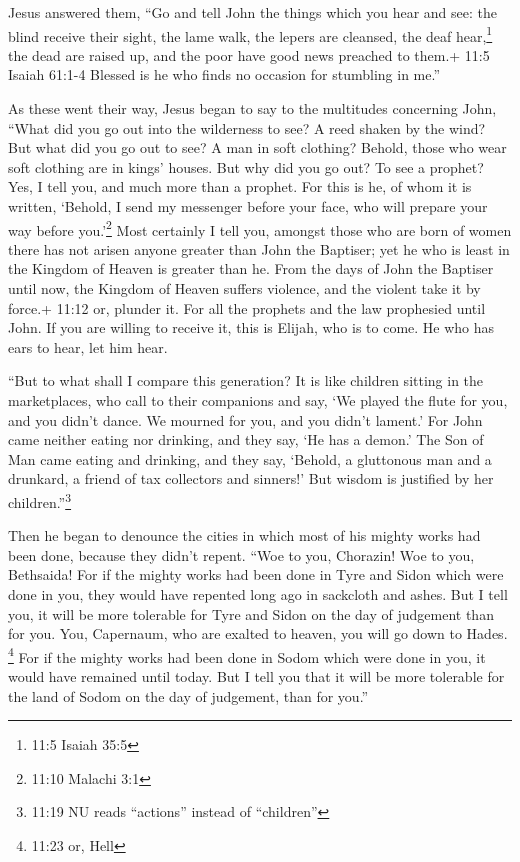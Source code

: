  Jesus answered them, ``Go and tell John the things which
you hear and see:  the blind receive their sight, the lame
walk, the lepers are cleansed, the deaf hear,\footnote{11:5 Isaiah 35:5}
the dead are raised up, and the poor have good news preached to them.+
11:5 Isaiah 61:1-4  Blessed is he who finds no occasion for
stumbling in me.''

 As these went their way, Jesus began to say to the
multitudes concerning John, ``What did you go out into the wilderness to
see? A reed shaken by the wind?  But what did you go out to
see? A man in soft clothing? Behold, those who wear soft clothing are in
kings' houses.  But why did you go out? To see a prophet?
Yes, I tell you, and much more than a prophet.  For this is
he, of whom it is written, `Behold, I send my messenger before your
face, who will prepare your way before you.'\footnote{11:10 Malachi 3:1}
 Most certainly I tell you, amongst those who are born of
women there has not arisen anyone greater than John the Baptiser; yet he
who is least in the Kingdom of Heaven is greater than he. 
From the days of John the Baptiser until now, the Kingdom of Heaven
suffers violence, and the violent take it by force.+ 11:12 or, plunder
it.  For all the prophets and the law prophesied until
John.  If you are willing to receive it, this is Elijah,
who is to come.  He who has ears to hear, let him hear.

 ``But to what shall I compare this generation? It is like
children sitting in the marketplaces, who call to their companions
 and say, `We played the flute for you, and you didn't
dance. We mourned for you, and you didn't lament.'  For
John came neither eating nor drinking, and they say, `He has a demon.'
 The Son of Man came eating and drinking, and they say,
`Behold, a gluttonous man and a drunkard, a friend of tax collectors and
sinners!' But wisdom is justified by her children.''\footnote{11:19 NU
  reads ``actions'' instead of ``children''}

 Then he began to denounce the cities in which most of his
mighty works had been done, because they didn't repent. 
``Woe to you, Chorazin! Woe to you, Bethsaida! For if the mighty works
had been done in Tyre and Sidon which were done in you, they would have
repented long ago in sackcloth and ashes.  But I tell you,
it will be more tolerable for Tyre and Sidon on the day of judgement
than for you.  You, Capernaum, who are exalted to heaven,
you will go down to Hades. \footnote{11:23 or, Hell} For if the mighty
works had been done in Sodom which were done in you, it would have
remained until today.  But I tell you that it will be more
tolerable for the land of Sodom on the day of judgement, than for you.''

